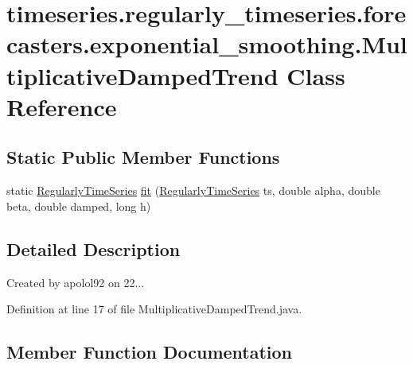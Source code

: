 \hypertarget{classtimeseries_1_1regularly__timeseries_1_1forecasters_1_1exponential__smoothing_1_1_multiplicative_damped_trend}{}\section{timeseries.\+regularly\+\_\+timeseries.\+forecasters.\+exponential\+\_\+smoothing.\+Multiplicative\+Damped\+Trend Class Reference}
\label{classtimeseries_1_1regularly__timeseries_1_1forecasters_1_1exponential__smoothing_1_1_multiplicative_damped_trend}
\subsection*{Static Public Member Functions}
\begin{DoxyCompactItemize}
\item 
static \hyperlink{classtimeseries_1_1_regularly_time_series}{Regularly\+Time\+Series} \hyperlink{classtimeseries_1_1regularly__timeseries_1_1forecasters_1_1exponential__smoothing_1_1_multiplicative_damped_trend_a4cba472f0f016f327076994d84345f55}{fit} (\hyperlink{classtimeseries_1_1_regularly_time_series}{Regularly\+Time\+Series} ts, double alpha, double beta, double damped, long h)
\end{DoxyCompactItemize}


\subsection{Detailed Description}
Created by apolol92 on 22... 

Definition at line 17 of file Multiplicative\+Damped\+Trend.\+java.



\subsection{Member Function Documentation}
\hypertarget{classtimeseries_1_1regularly__timeseries_1_1forecasters_1_1exponential__smoothing_1_1_multiplicative_damped_trend_a4cba472f0f016f327076994d84345f55}{}
